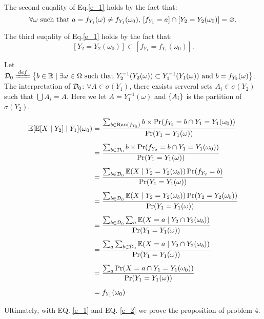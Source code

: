 \documentclass{article}
\begin{document}
The second euqality of Eq.\ref{e_1} holds by the fact that:
\[
	\forall\omega\mbox{ such that }a=f_{Y_1}(\omega)\ne f_{Y_1}(\omega_0)\mbox{, }\qty[f_{Y_1}=a]\cap\qty[Y_2=Y_2(\omega_0)]=\varnothing
.\]

The third euqality of Eq.\ref{e_1} holds by the fact that:
\[
	[Y_2=Y_2(\omega_0)]\subset[f_{Y_1}=f_{Y_1}(\omega_0)]
.\] 

Let $\+D_0\deq \set{b\in\RR\mid \exists \omega\in\Omega \mbox{ such that } Y_2^{-1}(Y_2(\omega))\subset Y_1^{-1}(Y_1(\omega))\mbox{ and } b=f_{Y_2}(\omega)}$. The interpretation of $\mathcal{D}_0$: $\forall A\in\sigma(Y_1)$, there exsists serveral sets $A_i\in\sigma(Y_2)$ such that $\bigcup A_i=A$. Here we let $A=Y_1^{-1}(\omega)$ and $\qty{A_i}$ is the partition of $\sigma(Y_2)$.

\begin{equation}
	\begin{aligned}
		\mathbb{E}[\mathbb{E}[X\mid Y_2]\mid Y_1](\omega_0)
		&=
		\frac{\sum_{b\in\mathrm{Ran}(f_{Y_2})}b\times\Pr(f_{Y_2}=b\cap Y_1=Y_1(\omega_0))}
		{\Pr(Y_1=Y_1(\omega))}
		\\[5pt]&=
		\frac{\sum_{b\in\mathcal{D}_0}b\times\Pr(f_{Y_2}=b\cap Y_1=Y_1(\omega_0))}
		{\Pr(Y_1=Y_1(\omega))}
		\\[5pt]&=
		\frac{\sum_{b\in\mathcal{D}_0}\mathbb{E}(X\mid Y_2=Y_2(\omega_b))\Pr(f_{Y_2}=b)}
		{\Pr(Y_1=Y_1(\omega))}
		\\[5pt]&=
		\frac{\sum_{b\in\mathcal{D}_0}\mathbb{E}(X\mid Y_2=Y_2(\omega_b))\Pr({Y_2}=Y_2(\omega_b))}
		{\Pr(Y_1=Y_1(\omega))}
		\\[5pt]&=
		\frac{\sum_{b\in\mathcal{D}_0}\sum_a\mathbb{E}(X=a\mid Y_2\cap Y_2(\omega_b))}
		{\Pr(Y_1=Y_1(\omega))}
		\\[5pt]&=
		\frac{\sum_a\sum_{b\in\mathcal{D}_0}\mathbb{E}(X=a\mid Y_2\cap Y_2(\omega_b))}
		{\Pr(Y_1=Y_1(\omega))}
		\\[5pt]&=
		\frac{\sum_a\Pr(X=a\cap Y_1=Y_1(\omega_0))}
		{\Pr(Y_1=Y_1(\omega))}
		\\[5pt]&=
		f_{Y_1}(\omega_0)
	\end{aligned}
	\label{e_2}
\end{equation}

Ultimately, with EQ. \ref{e_1} and EQ. \ref{e_2} we prove the proposition of problem 4.
\end{document}
